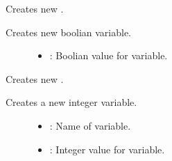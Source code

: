 \documentclass[letterpaper,10pt,english]{sphinxmanual}
\begin{document}
\begin{fulllineitems}

\begin{fulllineitems}
\label{\detokenize{index:_CPPv2N7ostendo3Var3VarEb}}%
\pysigstartmultiline
{}\label{\detokenize{index:Pessumstructostendo_1_1Var_1a1c3bc2ea850b6748989a70f82f73c62a}}%
\pysigstopmultiline
Creates new {\hyperref[\detokenize{index:Pessumstructostendo_1_1Var}]{}}. 

Creates new boolian variable. \begin{description}
\item[{}] \leavevmode\begin{itemize}
\item {} 
: Boolian value for variable. 

\end{itemize}

\end{description}


\end{fulllineitems}


\begin{fulllineitems}
\label{\detokenize{index:_CPPv2N7ostendo3Var3VarENSt6stringEi}}%
\pysigstartmultiline
{}\label{\detokenize{index:Pessumstructostendo_1_1Var_1a54737db1fa6cd70f182ad2a7b1904f7d}}%
\pysigstopmultiline
Creates new {\hyperref[\detokenize{index:Pessumstructostendo_1_1Var}]{}}. 

Creates a new integer variable. \begin{description}
\item[{}] \leavevmode\begin{itemize}
\item {} 
: Name of variable. 

\item {} 
: Integer value for variable. 

\end{itemize}

\end{description}



\end{fulllineitems}
\end{fulllineitems}
\end{document}
